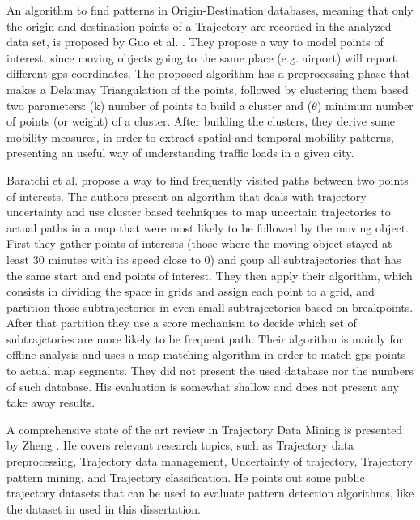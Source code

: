 An algorithm to find patterns in Origin-Destination databases, meaning that only the origin and destination points of a
Trajectory are recorded in the analyzed data set, is proposed by Guo et al. \citep{discovering_orig_dest}. They propose
a way to model points of interest, since moving objects going to the same place (e.g. airport) will report different
\ac{gps} coordinates. The proposed algorithm has a preprocessing phase that makes a Delaunay Triangulation of the
points, followed by clustering them based two parameters: (k) number of points to build a cluster and ($\theta$) minimum
number of points (or weight) of a cluster. After building the clusters, they derive some mobility measures, in order to
extract spatial and temporal mobility patterns, presenting an useful way of understanding traffic loads in a given city.

Baratchi et al. propose a way to find frequently visited paths between two points of interests. The authors present an
algorithm that deals with trajectory uncertainty and use cluster based techniques to map uncertain trajectories to
actual paths in a map that were most likely to be followed by the moving object. First they gather points of interests
(those where the moving object stayed at least 30 minutes with its speed close to 0) and goup all subtrajectories that
has the same start and end points of interest. They then apply their algorithm, which consists in dividing the space in
grids and assign each point to a grid, and partition those subtrajectories in even small subtrajectories based on
breakpoints. After that partition they use a score mechanism to decide which set of subtrajctories are more likely to be
frequent path. Their algorithm is mainly for offline analysis and uses a map matching algorithm in order to match
\ac{gps} points to actual map segments. They did not present the used database nor the numbers of such database. His
evaluation is somewhat shallow and does not present any take away results.

A comprehensive state of the art review in Trajectory Data Mining is presented by Zheng \citep{survey}. He covers
relevant research topics, such as Trajectory data preprocessing, Trajectory data management, Uncertainty of trajectory,
Trajectory pattern mining, and Trajectory classification. He points out some public trajectory datasets that can be used
to evaluate pattern detection algorithms, like the dataset in \citep{tdrive} used in this dissertation.

